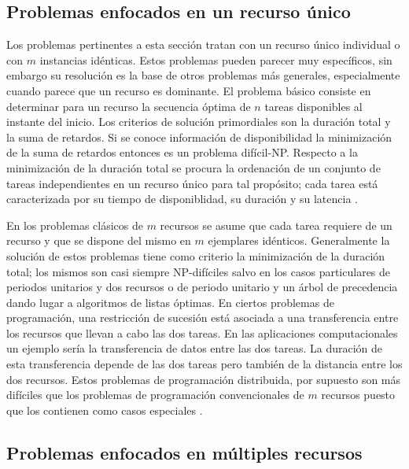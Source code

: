 \documentclass[spanish,draft,12pt,headsepline,footsepline,paper=letter]{scrreprt}
\begin{document}
\subsection{Problemas enfocados en un recurso único}
\label{problemas_enfocados_recurso_unico}

Los problemas pertinentes a esta sección tratan con un recurso único individual o con $m$ instancias idénticas. Estos problemas pueden parecer muy específicos, sin embargo su resolución es la base de otros problemas más generales, especialmente cuando parece que un recurso es dominante. 
%
El problema básico consiste en determinar para un recurso la secuencia óptima de $n$ tareas disponibles al instante del inicio. Los criterios de solución primordiales son la duración total y la suma de retardos. Si se conoce información de disponibilidad la minimización de la suma de retardos entonces es un problema difícil-NP. Respecto a la minimización de la duración total se procura la ordenación de un conjunto de tareas independientes en un recurso único para tal propósito; cada tarea está caracterizada por su tiempo de disponiblidad, su duración y su latencia \citep[p.~94-96]{gotha93les-problemes-dordonnancement}. 

En los problemas clásicos de $m$ recursos se asume que cada tarea requiere de un recurso y que se dispone del mismo en $m$ ejemplares idénticos. Generalmente la solución de estos problemas tiene como criterio la minimización de la duración total; los mismos son casi siempre NP-difíciles salvo en los casos particulares de periodos unitarios y dos recursos o de periodo unitario y un árbol de precedencia dando lugar a algoritmos de listas óptimas. En ciertos problemas de programación, una restricción de sucesión está asociada a una transferencia entre los recursos que llevan a cabo las dos tareas. En las aplicaciones computacionales un ejemplo sería la transferencia de datos entre las dos tareas. La duración de esta transferencia depende de las dos tareas pero también de la distancia entre los dos recursos. Estos problemas de programación distribuida, por supuesto son más difíciles que los problemas de programación convencionales de $m$ recursos puesto que los contienen como casos especiales \citep[p.~99]{gotha93les-problemes-dordonnancement}.

\subsection{Problemas enfocados en múltiples recursos}
\label{problemas_enfocados_multiples_recursos}
\end{document}
